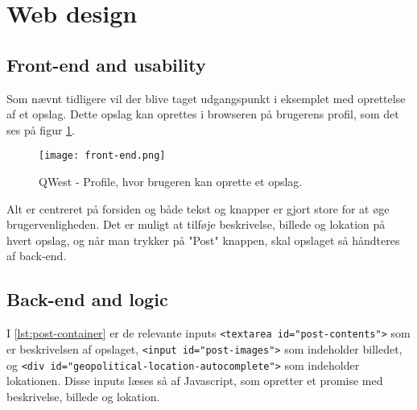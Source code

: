 \section{Web design}\label{sec:webdesign}
\subsection{Front-end and usability}\label{sec:frontend}
Som nævnt tidligere vil der blive taget udgangspunkt i eksemplet med oprettelse af et opslag. Dette opslag kan oprettes i browseren på brugerens profil, som det ses på figur \ref{fig:frontend}.

\begin{figure}
    \texttt{[image: front-end.png]}
    \caption{QWest - Profile, hvor brugeren kan oprette et opslag.}
    \label{fig:frontend}
\end{figure}

Alt er centreret på forsiden og både tekst og knapper er gjort store for at øge brugervenligheden. Det er muligt at tilføje beskrivelse, billede og lokation på hvert opslag, og når man trykker på "Post" knappen, skal opslaget så håndteres af back-end. 

\subsection{Back-end and logic}\label{sec:backend}


I \ref{lst:post-container} er de relevante inputs \texttt{<textarea id="post-contents">} som er beskrivelsen af opslaget, \texttt{<input id="post-images">} som indeholder billedet, og \texttt{<div id="geopolitical-location-autocomplete">} som indeholder lokationen. 
Disse inputs læses så af Javascript, som opretter et promise \cite{Promise} med beskrivelse, billede og lokation.

